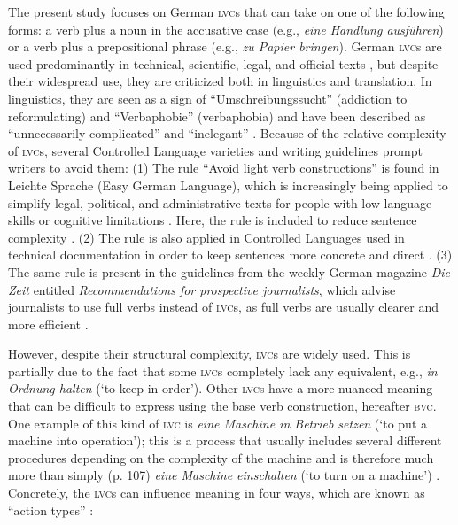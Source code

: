 \documentclass[output=paper]{langsci/langscibook}
\begin{document}
The present study focuses on German \textsc{lvc}s that can take on one of the following forms: a verb plus a noun in the accusative case (e.g., \textit{eine Handlung ausführen}) or a verb plus a prepositional phrase (e.g., \textit{zu Papier bringen}). German \textsc{lvc}s are used predominantly in technical, scientific, legal, and official texts \citep[38f.]{Bruker2013}, but despite their widespread use, they are criticized both in linguistics and translation. In linguistics, they are seen as a sign of “Umschreibungssucht” (addiction to reformulating) and “Verbaphobie” (verbaphobia) \citep[9f.]{Daniels1963} and have been described as “unnecessarily complicated” and “inelegant” \citep{Storrer2006a}. Because of the relative complexity of \textsc{lvc}s, several Controlled Language varieties and writing guidelines prompt writers to avoid them: (1) The rule “Avoid light verb constructions” is found in Leichte Sprache (Easy German Language), which is increasingly being applied to simplify legal, political, and administrative texts for people with low language skills or cognitive limitations \citep{Hansen-Schirra2018}. Here, the rule is included to reduce sentence complexity \citep{ubhd-67957969}. (2) The rule is also applied in Controlled Languages used in technical documentation in order to keep sentences more concrete and direct \citep[107]{GesellschaftfurTechnischeKommunikation2013}. (3) The same rule is present in the guidelines from the weekly German magazine \textit{Die Zeit} entitled \textit{Recommendations for prospective journalists}, which advise journalists to use full verbs instead of \textsc{lvc}s, as full verbs are usually clearer and more efficient \citep{Zeit2007}.

However, despite their structural complexity, \textsc{lvc}s are widely used. This is partially due to the fact that some \textsc{lvc}s completely lack any equivalent, e.g., \textit{in Ordnung halten} (`to keep in order'). Other \textsc{lvc}s have a more nuanced meaning that can be difficult to express using the base verb construction, hereafter \textsc{bvc}. One example of this kind of \textsc{lvc} is \textit{eine Maschine in Betrieb setzen} (`to put a machine into operation'); this is a process that usually includes several different procedures depending on the complexity of the machine and is therefore much more than simply (p. 107) \textit{eine Maschine einschalten} (`to turn on a machine') \citep{ubhd-67954849}. Concretely, the \textsc{lvc}s can influence meaning in four ways, which are known as “action types” \citep*[704]{Zifonun1997}:
\end{document}
